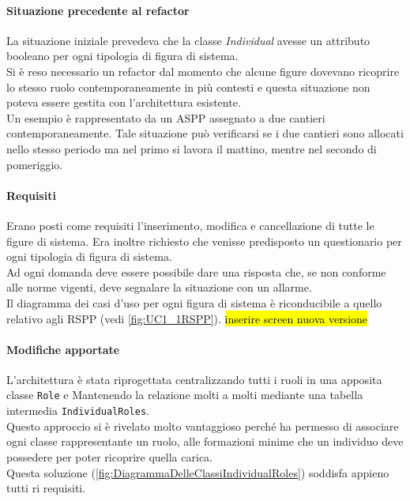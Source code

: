 	\paragraph*{Situazione precedente al refactor} 
	
	La situazione iniziale prevedeva che la classe \textit{Individual} avesse  un attributo booleano per ogni tipologia di figura di sistema. \\
	Si è reso necessario un refactor dal momento che alcune figure dovevano ricoprire lo stesso ruolo contemporaneamente in più contesti e questa situazione non poteva essere gestita con l'architettura esistente. \\
	Un esempio è rappresentato da un ASPP assegnato a due cantieri contemporaneamente. Tale situazione può verificarsi se i due cantieri sono allocati nello stesso periodo ma nel primo si lavora il mattino, mentre nel secondo di pomeriggio.\\
	
	\paragraph*{Requisiti}
		
	Erano posti come requisiti l'inserimento, modifica e cancellazione di tutte le figure di sistema. Era inoltre richiesto che venisse predisposto un questionario per ogni tipologia di figura di sistema. \\
	Ad ogni domanda deve essere possibile dare una risposta che, se non conforme alle norme vigenti, deve segnalare la situazione con un allarme.\\
	
	Il diagramma dei casi d'uso per ogni figura di sistema è riconducibile a quello relativo agli RSPP (vedi  \autoref{fig:UC1_1RSPP}).
	\hl{inserire screen nuova versione}
	
	
	\paragraph{Modifiche apportate}
	
	
	
	L'architettura è stata riprogettata centralizzando tutti i ruoli in una apposita classe \texttt{Role} e Mantenendo la relazione molti a molti mediante una tabella intermedia \texttt{IndividualRoles}. \\	Questo approccio si è rivelato molto vantaggioso perché ha permesso di associare ogni classe rappresentante un ruolo, alle formazioni minime che un individuo deve possedere per poter ricoprire quella carica. \\
	Questa soluzione (\autoref{fig:DiagrammaDelleClassiIndividualRoles}) soddisfa appieno tutti ri requisiti.
	
